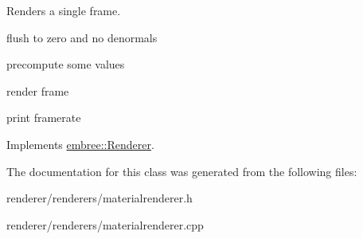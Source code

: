 Renders a single frame. 



flush to zero and no denormals

precompute some values

render frame

print framerate 



Implements \hyperlink{classembree_1_1_renderer_acefb5f55e45bc9b846e1619977926529}{embree::Renderer}.



The documentation for this class was generated from the following files:\begin{DoxyCompactItemize}
\item 
renderer/renderers/materialrenderer.h\item 
renderer/renderers/materialrenderer.cpp\end{DoxyCompactItemize}
